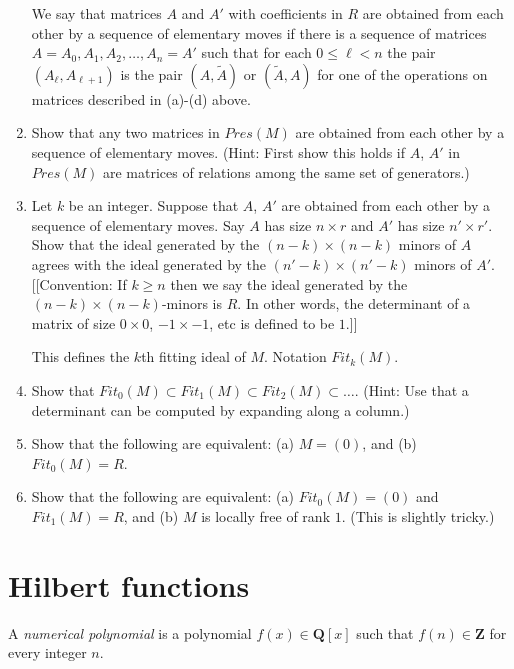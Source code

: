 \begin{exercise}
\begin{enumerate}
\smallskip\noindent
We say that matrices $A$ and $A'$ with coefficients in $R$
are obtained from each other by a sequence of elementary moves if
there is a sequence of matrices $A = A_0, A_1, A_2, \ldots, A_n = A'$ such
that for each $0\leq \ell < n$ the pair $(A_\ell, A_{\ell + 1})$ is the
pair $(A, \tilde A)$ or $(\tilde A, A)$ for one of the operations on
matrices described in (a)-(d) above.

\item Show that any two matrices in $Pres(M)$ are obtained from
each other by a sequence of elementary moves. (Hint: First show this
holds if $A$, $A'$ in $Pres(M)$ are matrices of relations among the same
set of generators.)
\item Let $k$ be an integer. Suppose that $A$, $A'$ are obtained from
each other by a sequence of elementary moves. Say $A$ has size $n \times r$
and $A'$ has size $n' \times r'$. Show that the ideal generated by the
$(n-k)\times (n-k)$ minors of $A$ agrees with the ideal generated by the
$(n'-k)\times (n'-k)$ minors of $A'$. [[Convention: If $k\geq n$ then we say
the ideal generated by the $(n-k)\times (n-k)$-minors is $R$. In other words,
the determinant of a matrix of size $0 \times 0$, $-1 \times -1$, etc
is defined to be $1$.]]

\smallskip\noindent
This defines the $k$th fitting ideal of $M$. Notation $Fit_k(M)$.

\item Show that
$Fit_0(M) \subset Fit_1(M) \subset Fit_2(M) \subset \ldots$.
(Hint: Use that a determinant can be computed by expanding along a column.)
\item Show that the following are equivalent:
(a) $M = (0)$, and (b) $Fit_0(M) = R$.
\item Show that the following are equivalent:
(a) $Fit_0(M) = (0)$ and $Fit_1(M) = R$, and (b) $M$ is
locally free of rank $1$. (This is slightly tricky.)
\end{enumerate}
\end{exercise}




\section{Hilbert functions}
\label{section-hilbert}

\begin{definition}
\label{definition-numerical-polynomial}
A {\it numerical polynomial} is a polynomial $f(x) \in {\mathbf Q}[x]$
such that $f(n) \in {\mathbf Z}$ for every integer $n$.
\end{definition}


